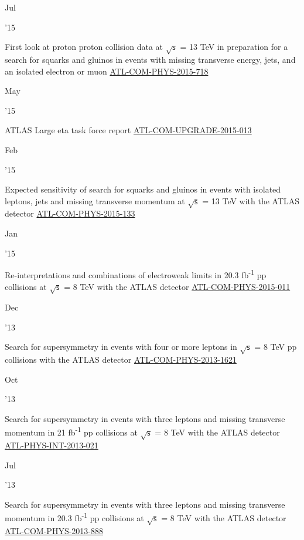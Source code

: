\documentclass[]{cv} %
\begin{document}
\begin{entrylist}

  \entry
  {\parbox[t]{\parboxWidthOne}{Jul}\parbox[t]{\parboxWidthTwo}{\hfill '15}}
  {First look at proton proton collision data at $\sqrt{\mathsf{s}}$ = 13 TeV in
  preparation for a search for squarks and gluinos in events with missing
  transverse energy, jets, and an isolated electron or muon}
{\href{https://cds.cern.ch/record/2034389}{ATL-COM-PHYS-2015-718}}
{\vspace*{\spacingPubs}}

  \entry
  {\parbox[t]{\parboxWidthOne}{May}\parbox[t]{\parboxWidthTwo}{\hfill '15}}
  {ATLAS Large eta task force report}
{\href{https://cds.cern.ch/record/2016324}{ATL-COM-UPGRADE-2015-013}}
{\vspace*{\spacingPubs}}

  \entry
  {\parbox[t]{\parboxWidthOne}{Feb}\parbox[t]{\parboxWidthTwo}{\hfill '15}}
  {Expected sensitivity of search for squarks and gluinos in events with
    isolated leptons, jets and missing transverse momentum at
    $\sqrt{\mathsf{s}}$ = 13 TeV with the ATLAS detector}
{\href{https://cds.cern.ch/record/1994195}{ATL-COM-PHYS-2015-133}}
{\vspace*{\spacingPubs}}

  \entry
  {\parbox[t]{\parboxWidthOne}{Jan}\parbox[t]{\parboxWidthTwo}{\hfill '15}}
  {Re-interpretations and combinations of electroweak limits in
    20.3 fb\textsuperscript{-1} pp collisions at $\sqrt{\mathsf{s}}$
  = 8 TeV with the ATLAS detector}
{\href{https://cds.cern.ch/record/1981548}{ATL-COM-PHYS-2015-011}}
{\vspace*{\spacingPubs}}

  \entry
  {\parbox[t]{\parboxWidthOne}{Dec}\parbox[t]{\parboxWidthTwo}{\hfill '13}}
  {Search for supersymmetry in events with four or more leptons in $\sqrt{\mathsf{s}}$ = 8 TeV pp collisions with the ATLAS
detector}
{\href{https://cds.cern.ch/record/1635455}{ATL-COM-PHYS-2013-1621}}
{\vspace*{\spacingPubs}}

\entry
{\parbox[t]{\parboxWidthOne}{Oct}\parbox[t]{\parboxWidthTwo}{\hfill '13}}
{Search for supersymmetry in events with three leptons and missing transverse momentum in 21 fb\textsuperscript{-1} pp collisions
at $\sqrt{\mathsf{s}}$ = 8 TeV with the ATLAS detector}
{\href{https://cds.cern.ch/record/1610185}{ATL-PHYS-INT-2013-021}}
{\vspace*{\spacingPubs}}

\entry
{\parbox[t]{\parboxWidthOne}{Jul}\parbox[t]{\parboxWidthTwo}{\hfill '13}}
{Search for supersymmetry in events with three leptons and missing transverse momentum in 20.3 fb\textsuperscript{-1} pp
collisions at $\sqrt{\mathsf{s}}$ = 8 TeV with the ATLAS detector}
{\href{https://cds.cern.ch/record/1558985}{ATL-COM-PHYS-2013-888}}
{\vspace*{\spacingPubs}}


\end{entrylist}
\end{document}
